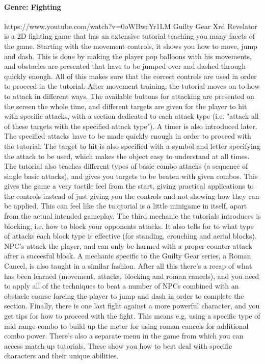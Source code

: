 \paragraph{Genre: Fighting}

https://www.youtube.com/watch?v=0oWBwcYr1LM
Guilty Gear Xrd Revelator is a 2D fighting game that has an extensive tutorial
teaching you many facets of the game. Starting with the movement controls, it
shows you how to move, jump and dash. This is done by making the player pop
balloons with his movements, and obstacles are presented that have to be
jumped over and dashed through quickly enough. All of this makes sure that the correct controls are used in
order to proceed in the tutorial.
After movement training, the tutorial moves on to how to attack in different
ways. The available buttons for attacking are presented on the screen the
whole time, and different targets are given for the player to hit with
specific attacks, with a section dedicated to each attack type (i.e. "attack
all of these targets with the specified attack type"). A timer is also
introduced later. The specified attacks have to be made quickly enough in
order to proceed with the tutorial. The target to hit is also specified with a
symbol and letter specifying the attack to be used, which makes the object
easy to understand at all times. The tutorial also teaches different types of
basic combo attacks (a sequence of single basic attacks), and gives you targets to be beaten with given combos.
This gives the game a very tactile feel from the start, giving practical
applications to the controls instead of just giving you the controls and not
showing how they can be applied. This can feel like the tu:qtorial is a little
minigame in itself, apart from the actual intended gameplay.
The third mechanic the tutorials introduces is blocking, i.e. how to block
your opponents attacks. It also tells for to what type of attacks each block
type is effective (for standing, crouching and aerial blocks). NPC's attack
the player, and can only be harmed with a proper counter attack after a
succesful block. A mechanic specific to the Guilty Gear series, a Roman
Cancel, is also taught in a similar fashion.
After all this there's a recap of what has been learned (movement, attacks,
blocking and roman cancels), and you need to apply all of the techniques to
beat a number of NPCs combined with an obstacle course forcing the player to
jump and dash in order to complete the section. Finally, there is one last
fight against a more powerful character, and you get tips for how to proceed
with the fight. This means e.g. using a specific type of mid range combo to
build up the meter for using roman cancels for additional combo power.
There's also a separate menu in the game from which you can access match-up
tutorials. These show you how to best deal with specific characters and their
unique abilities.

